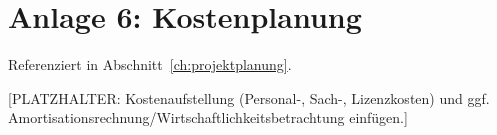 \section*{Anlage 6: Kostenplanung}
\label{anh:kostenplanung}
Referenziert in Abschnitt~\ref{ch:projektplanung}.

[PLATZHALTER: Kostenaufstellung (Personal-, Sach-, Lizenzkosten) und ggf.
Amortisationsrechnung/Wirtschaftlichkeitsbetrachtung einf\"ugen.]
